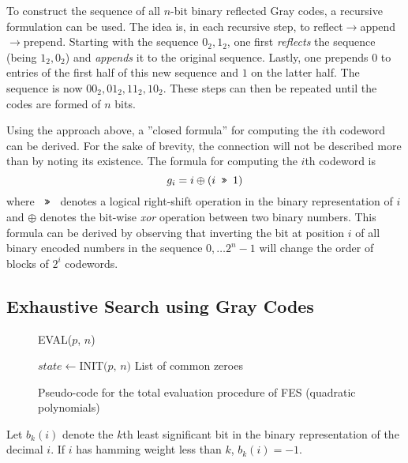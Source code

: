 To construct the sequence of all $n$-bit binary reflected Gray codes, a recursive formulation can be used. The idea is, in each recursive step, to reflect$\rightarrow$append$\rightarrow$prepend. Starting with the sequence $0_2, 1_2$, one first \textit{reflects} the sequence (being $1_2, 0_2$) and \textit{appends} it to the original sequence. Lastly, one prepends $0$ to entries of the first half of this new sequence and $1$ on the latter half. The sequence is now $00_2, 01_2, 11_2, 10_2$. These steps can then be repeated until the codes are formed of $n$ bits.

Using the approach above, a ''closed formula'' for computing the $i$th codeword can be derived. For the sake of brevity, the connection will not be described more than by noting its existence. The formula for computing the $i$th codeword is
$$
    g_i = i \oplus (i \texttt{ >> } 1)
$$
where $\texttt{ >> }$ denotes a logical right-shift operation in the binary representation of $i$ and $\oplus$ denotes the bit-wise \textit{xor} operation between two binary numbers. This formula can be derived by observing that inverting the bit at position $i$ of all binary encoded numbers in the sequence $0,\dots 2^{n} - 1$ will change the order of blocks of $2^i$ codewords.

\subsection{Exhaustive Search using Gray Codes} \label{sec:prereq:fes:exh_g_code}
\begin{figure}[t]
    \begin{alg}
        \caption{EVAL($p$, $n$)}\label{alg:fes_eval}
        $state \gets \text{INIT($p$, $n$)}$\;
        \Return List of common zeroes
    \end{alg}
    \caption{Pseudo-code for the total evaluation procedure of FES (quadratic polynomials)}
\end{figure}

\begin{defn}[] \label{sec:prereq:def:bk}
    Let $b_k(i)$ denote the $k$th least significant bit in the binary representation of the decimal $i$. If $i$ has hamming weight less than $k$, $b_k(i) = -1$.
\end{defn}

